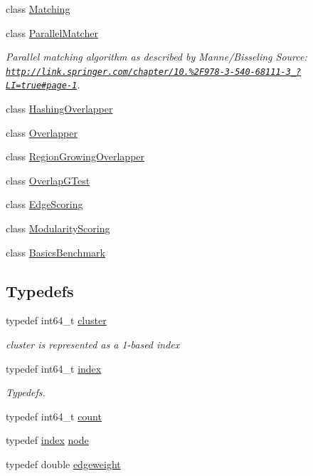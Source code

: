 \begin{DoxyCompactItemize}
\item 
class \hyperlink{class_networ_kit_1_1_matching}{Matching}
\item 
class \hyperlink{class_networ_kit_1_1_parallel_matcher}{Parallel\-Matcher}
\begin{DoxyCompactList}\small\item\em Parallel matching algorithm as described by Manne/\-Bisseling Source\-: \href{http://link.springer.com/chapter/10.1007%2F978-3-540-68111-3_74?LI=true#page-1}{\tt http\-://link.\-springer.\-com/chapter/10.\-1007\%2\-F978-\/3-\/540-\/68111-\/3\-\_\-74?\-L\-I=true\#page-\/1}. \end{DoxyCompactList}\item 
class \hyperlink{class_networ_kit_1_1_hashing_overlapper}{Hashing\-Overlapper}
\item 
class \hyperlink{class_networ_kit_1_1_overlapper}{Overlapper}
\item 
class \hyperlink{class_networ_kit_1_1_region_growing_overlapper}{Region\-Growing\-Overlapper}
\item 
class \hyperlink{class_networ_kit_1_1_overlap_g_test}{Overlap\-G\-Test}
\item 
class \hyperlink{class_networ_kit_1_1_edge_scoring}{Edge\-Scoring}
\item 
class \hyperlink{class_networ_kit_1_1_modularity_scoring}{Modularity\-Scoring}
\item 
class \hyperlink{class_networ_kit_1_1_basics_benchmark}{Basics\-Benchmark}
\end{DoxyCompactItemize}
\subsection*{Typedefs}
\begin{DoxyCompactItemize}
\item 
typedef int64\-\_\-t \hyperlink{namespace_networ_kit_aee72806475c8d37642866ab18aceab8b}{cluster}
\begin{DoxyCompactList}\small\item\em cluster is represented as a 1-\/based index \end{DoxyCompactList}\item 
typedef int64\-\_\-t \hyperlink{namespace_networ_kit_af49e67df68af41dcd75dffbb1e9abee6}{index}
\begin{DoxyCompactList}\small\item\em Typedefs. \end{DoxyCompactList}\item 
typedef int64\-\_\-t \hyperlink{namespace_networ_kit_ad4c536a5339a8bf2f91f418b9a67a7d8}{count}
\item 
typedef \hyperlink{namespace_networ_kit_af49e67df68af41dcd75dffbb1e9abee6}{index} \hyperlink{namespace_networ_kit_a61914158fd771265be48de9942369160}{node}
\item 
typedef double \hyperlink{namespace_networ_kit_a831b108dbcd79dad062d9e28b1b4e3dd}{edgeweight}
\end{DoxyCompactItemize}
